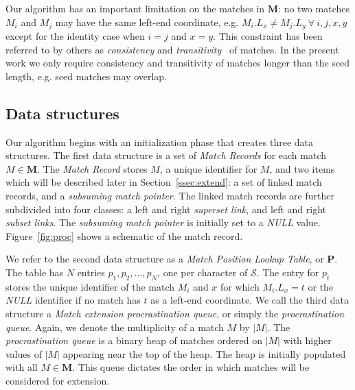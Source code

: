 \documentclass{llncs}
\begin{document}
Our algorithm has an important limitation on the matches in
$\mathbf{M}$: no two matches $M_i$ and $M_j$ may have the same
left-end coordinate, e.g. $M_i.L_x \neq M_j.L_y~\forall~i, j, x, y$
except for the identity case when $i=j$ and $x=y$.  This constraint
has been referred to by others as \textit{consistency} and
\textit{transitivity}~\cite{ref-transitivity} of matches.  In the
present work we only require consistency and transitivity of matches
longer than the seed length, e.g. seed matches may overlap.

\subsection{Data structures}
Our algorithm begins with an initialization phase that creates three
data structures. The first data structure is a set of \textit{Match
Records} for each match $M \in \mathbf{M}$.  The \textit{Match
Record} stores $M$, a unique identifier for $M$, and two items which
will be described later in Section~\ref{ssec:extend}: a set of
linked match records, and a \textit{subsuming match pointer}. The
linked match records are further subdivided into four classes: a
left and right \textit{superset link}, and left and right
\textit{subset links}.  The \textit{subsuming match pointer} is
initially set to a \textit{NULL} value. Figure~\ref{fig:proc} shows
a schematic of the match record.

We refer to the second data structure as a \textit{Match Position
Lookup Table}, or $\mathbf{P}$. The table has $N$ entries $p_1,
p_2,\dots,p_N$, one per character of $\mathcal{S}$. The entry for
$p_t$ stores the unique identifier of the match $M_i$ and $x$ for
which $M_i.L_x = t$ or the \textit{NULL} identifier if no match has
$t$ as a left-end coordinate. We call the third data structure a
\textit{Match extension procrastination queue}, or simply the
\textit{procrastination queue}. Again, we denote the multiplicity of
a match $M$ by $|M|$. The \textit{procrastination queue} is a binary
heap of matches ordered on $|M|$ with higher values of $|M|$
appearing near the top of the heap. The heap is initially populated
with all $M \in \mathbf{M}$. This queue dictates the order in which
matches will be considered for extension.
\end{document}
